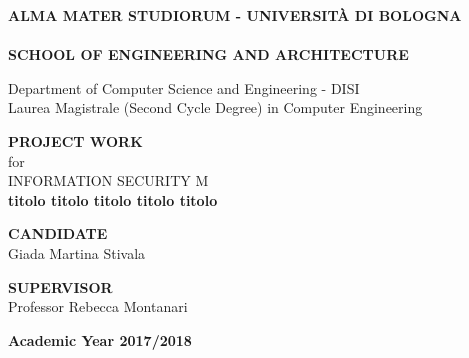 \thispagestyle{empty}
\begin{titlepage}

\vspace*{-1.5cm}
\begin{center}
  \large
  \textbf{ALMA MATER STUDIORUM - UNIVERSIT\`A DI BOLOGNA}\\
  
  \hrulefill\\
  
  \textbf{SCHOOL OF ENGINEERING AND ARCHITECTURE}\\
  \vspace*{.75cm}
  
  
  Department of Computer Science and Engineering - DISI\\
  Laurea Magistrale (Second Cycle Degree) in Computer Engineering\\
  
  \vspace*{1.2cm}
  
  
  \textbf{PROJECT WORK}\\
  \vspace*{.4cm}
  for\\
  \vspace*{.4cm}
  INFORMATION SECURITY M\\

  \vspace*{2cm} \LARGE
  \textbf{titolo titolo titolo titolo titolo}\\
 \end{center}
 
 \vspace*{3cm}
 
 \begin{flushleft}
  \textbf{CANDIDATE}\\ Giada Martina Stivala \\
\end{flushleft}

\vspace*{-2cm}

 \begin{flushright}
  \textbf{SUPERVISOR}\\ Professor Rebecca Montanari \\
 \end{flushright}


\vspace*{2cm}

\begin{center}
	\textbf{
  Academic Year 2017/2018\\
  }
\end{center} 
\clearpage
\end{titlepage}